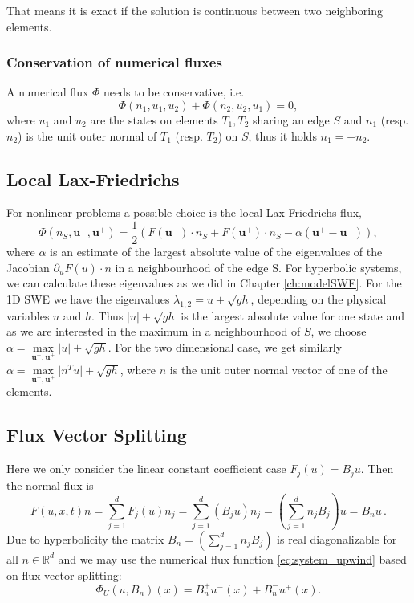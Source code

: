 \documentclass[a4paper,12pt]{article}
\theoremstyle{definition}
\theoremstyle{definition}
\newcommand{\Dim}{d}
\begin{document}
That means it is exact if the solution is continuous between two neighboring elements.

\subsubsection{Conservation of numerical fluxes}
A numerical flux $\Phi$ needs to be conservative, i.e. 
\begin{equation}
\Phi(n_1,u_1,u_2) + \Phi(n_2, u_2, u_1) = 0,
\end{equation}
where $u_1$ and $u_2$ are the states on elements $T_1, T_2$ sharing an edge $S$ and $n_1$ (resp. $n_2$) is the unit outer normal of $T_1$ (resp. $T_2$) on $S$, thus it holds $n_1 = -n_2$. 
 
\subsection{Local Lax-Friedrichs}

For nonlinear problems a possible choice is the local Lax-Friedrichs flux, 
\begin{equation}
\Phi (n_S, \mathbf{u}^-, \mathbf{u}^+) = \frac{1}{2}(F(\mathbf{u}^-)\cdot n_S + F(\mathbf{u}^+)\cdot n_S - \alpha (\mathbf{u}^+ -\mathbf{u}^- )),
\end{equation}
where $\alpha$ is an estimate of the largest absolute value of the eigenvalues of the Jacobian $\partial_u F(u)\cdot n$ in a neighbourhood of the edge S.
For hyperbolic systems, we can calculate these eigenvalues as we did in Chapter \ref{ch:modelSWE}.
For the 1D SWE we have the eigenvalues $\lambda_{1,2} = u \pm \sqrt{gh}$, depending on the physical variables $u$ and $h$.
Thus $\vert u \vert +\sqrt{gh}$ is the largest absolute value for one state and as we are interested in the maximum in a neighbourhood of $S$, we choose $\alpha = \max\limits_{\mathbf{u}^-, \mathbf{u}^+} \vert u \vert +\sqrt{gh}$.
For the two dimensional case, we get similarly $\alpha = \max\limits_{\mathbf{u}^-, \mathbf{u}^+} \vert n^Tu \vert +\sqrt{gh}$, where $n$ is the unit outer normal vector of one of the elements.


\subsection{Flux Vector Splitting}

Here we only consider the linear 
constant coefficient case $F_j(u) = B_j u$. Then the normal flux is
\begin{equation}
F(u,x,t)n = \sum_{j=1}^{\Dim} F_j(u) n_j = \sum_{j=1}^{\Dim} (B_j u) n_j
=\left( \sum_{j=1}^{\Dim} n_j B_j\right) u = B_n u \, .
\end{equation}
Due to hyperbolicity the matrix $B_n = \left( \sum_{j=1}^{\Dim} n_j B_j\right)$
is real diagonalizable for all $n\in\mathbb{R}^{\Dim}$ and we may use the numerical flux function
\eqref{eq:system_upwind} based on flux vector splitting:
\begin{equation}
\Phi_U(u,B_n)(x) = B_n^+ u^-(x) + B_n^- u^+(x) .
\end{equation}
\end{document}
